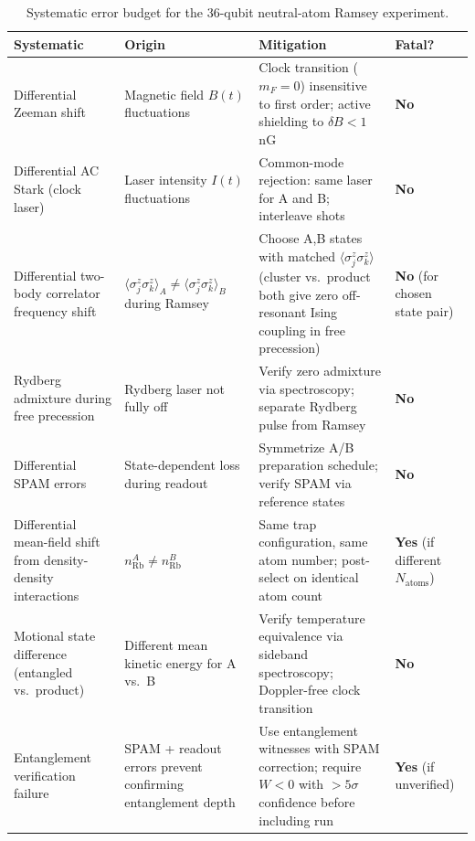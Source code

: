 \documentclass[12pt,letterpaper]{article}
\theoremstyle{plain}
\theoremstyle{definition}
\theoremstyle{remark}
\begin{document}
\begin{table}[h]
\centering\small
\caption{Systematic error budget for the 36-qubit neutral-atom Ramsey experiment.}
\label{tab:systematics}
\begin{tabular}{@{}p{4cm}p{3cm}p{4cm}p{2cm}@{}}
\toprule
Systematic & Origin & Mitigation & Fatal? \\
\midrule
Differential Zeeman shift & Magnetic field $B(t)$ fluctuations & Clock transition ($m_F=0$) insensitive to first order; active shielding to $\delta B < 1$\,nG & \textbf{No} \\
\addlinespace
Differential AC Stark (clock laser) & Laser intensity $I(t)$ fluctuations & Common-mode rejection: same laser for A and B; interleave shots & \textbf{No} \\
\addlinespace
Differential two-body correlator frequency shift & $\langle\sigma^z_j\sigma^z_k\rangle_A \neq \langle\sigma^z_j\sigma^z_k\rangle_B$ during Ramsey & Choose A,B states with matched $\langle\sigma^z_j\sigma^z_k\rangle$ (cluster vs.\ product both give zero off-resonant Ising coupling in free precession) & \textbf{No} (for chosen state pair) \\
\addlinespace
Rydberg admixture during free precession & Rydberg laser not fully off & Verify zero admixture via spectroscopy; separate Rydberg pulse from Ramsey & \textbf{No} \\
\addlinespace
Differential SPAM errors & State-dependent loss during readout & Symmetrize A/B preparation schedule; verify SPAM via reference states & \textbf{No} \\
\addlinespace
Differential mean-field shift from density-density interactions & $n_{\mathrm{Rb}}^A \neq n_{\mathrm{Rb}}^B$ & Same trap configuration, same atom number; post-select on identical atom count & \textbf{Yes} (if different $N_{\mathrm{atoms}}$) \\
\addlinespace
Motional state difference (entangled vs.\ product) & Different mean kinetic energy for A vs.\ B & Verify temperature equivalence via sideband spectroscopy; Doppler-free clock transition & \textbf{No} \\
\addlinespace
Entanglement verification failure & SPAM + readout errors prevent confirming entanglement depth & Use entanglement witnesses with SPAM correction; require $W < 0$ with $>5\sigma$ confidence before including run & \textbf{Yes} (if unverified) \\
\bottomrule
\end{tabular}
\end{table}
\end{document}

